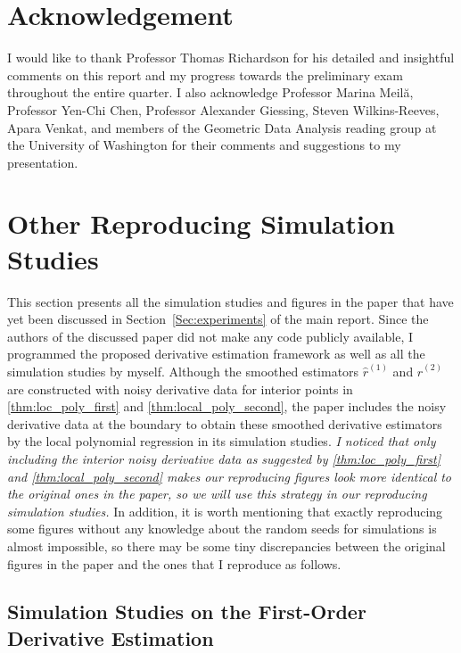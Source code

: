 \documentclass{uwstat572}
\theoremstyle{definition}
\renewcommand{\hat}{\widehat}
\theoremstyle{theorem}
\begin{document}
\pagebreak

\section*{Acknowledgement}

I would like to thank Professor Thomas Richardson for his detailed and insightful comments on this report and my progress towards the preliminary exam throughout the entire quarter. I also acknowledge Professor Marina Meil\u{a}, Professor Yen-Chi Chen, Professor Alexander Giessing, Steven Wilkins-Reeves, Apara Venkat, and members of the Geometric Data Analysis reading group at the University of Washington for their comments and suggestions to my presentation.



\appendix

\section{Other Reproducing Simulation Studies}
\label{App:repro}

This section presents all the simulation studies and figures in the paper \citep{liu2020smoothed} that have yet been discussed in Section~\ref{Sec:experiments} of the main report. Since the authors of the discussed paper did not make any code publicly available, I programmed the proposed derivative estimation framework as well as all the simulation studies by myself. Although the smoothed estimators $\hat{r}^{(1)}$ and $\hat{r}^{(2)}$ are constructed with noisy derivative data for interior points in \autoref{thm:loc_poly_first} and \autoref{thm:local_poly_second}, the paper includes the noisy derivative data at the boundary to obtain these smoothed derivative estimators by the local polynomial regression in its simulation studies. \emph{I noticed that only including the interior noisy derivative data as suggested by \autoref{thm:loc_poly_first} and \autoref{thm:local_poly_second} makes our reproducing figures look more identical to the original ones in the paper, so we will use this strategy in our reproducing simulation studies.} In addition, it is worth mentioning that exactly reproducing some figures without any knowledge about the random seeds for simulations is almost impossible, so there may be some tiny discrepancies between the original figures in the paper and the ones that I reproduce as follows.

\subsection{Simulation Studies on the First-Order Derivative Estimation}
\end{document}
